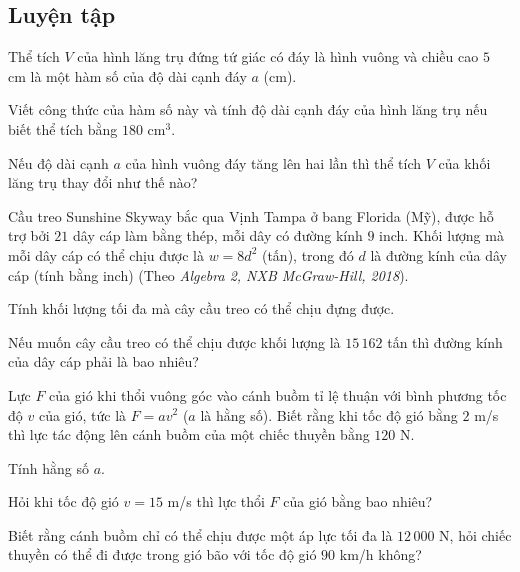 \begin{practice}
    \subsection{Luyện tập}

    \begin{questions}[series=SBT]
        \item Thể tích $V$ của hình lăng trụ đứng tứ giác có đáy là hình vuông và chiều cao $5$ cm là một hàm số của độ dài cạnh đáy $a$ (cm).
        \begin{questions}
            \item Viết công thức của hàm số này và tính độ dài cạnh đáy của hình lăng trụ nếu biết thể tích bằng $180$ cm$^3$.
            \item Nếu độ dài cạnh $a$ của hình vuông đáy tăng lên hai lần thì thể tích $V$ của khối lăng trụ thay đổi như thế nào?
        \end{questions}
        \answerline
        \answerline

        \item Cầu treo Sunshine Skyway bắc qua Vịnh Tampa ở bang Florida (Mỹ), được hỗ trợ bởi $21$ dây cáp làm bằng thép, mỗi dây có đường kính $9$ inch. Khối lượng mà mỗi dây cáp có thể chịu được là $w=8d^2$ (tấn), trong đó $d$ là đường kính của dây cáp (tính bằng inch) (Theo \textit{Algebra 2, NXB McGraw-Hill, 2018}).
        \begin{questions}
            \item Tính khối lượng tối đa mà cây cầu treo có thể chịu đựng được.
            \item Nếu muốn cây cầu treo có thể chịu được khối lượng là $15\,162$ tấn thì đường kính của dây cáp phải là bao nhiêu?
        \end{questions}
        \answerline
        \answerline

        \item Lực $F$ của gió khi thổi vuông góc vào cánh buồm tỉ lệ thuận với bình phương tốc độ $v$ của gió, tức là $F=av^2$ ($a$ là hằng số). Biết rằng khi tốc độ gió bằng $2$ m/s thì lực tác động lên cánh buồm của một chiếc thuyền bằng $120$ N.
        \begin{questions}
            \item Tính hằng số $a$.
            \item Hỏi khi tốc độ gió $v=15$ m/s thì lực thổi $F$ của gió bằng bao nhiêu?
            \item Biết rằng cánh buồm chỉ có thể chịu được một áp lực tối đa là $12\,000$ N, hỏi chiếc thuyền có thể đi được trong gió bão với tốc độ gió $90$ km/h không?
        \end{questions}
        \answerline
        \answerline
        \answerline


\end{questions}
\end{practice}

